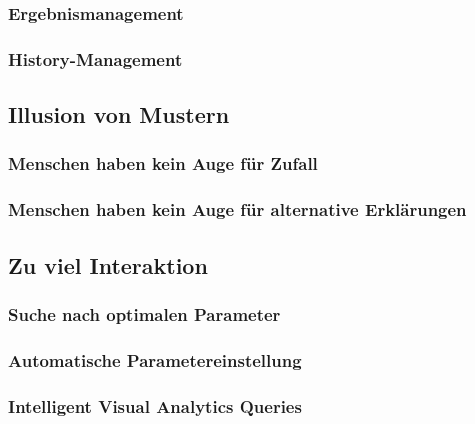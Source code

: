             \subsubsection{Ergebnismanagement} %

            \subsubsection{History-Management} %

        \subsection{Illusion von Mustern} %

            \subsubsection{Menschen haben kein Auge für Zufall} %

            \subsubsection{Menschen haben kein Auge für alternative Erklärungen} %

        \subsection{Zu viel Interaktion} %

            \subsubsection{Suche nach optimalen Parameter} %

            \subsubsection{Automatische Parametereinstellung} %

            \subsubsection{Intelligent Visual Analytics Queries} %

